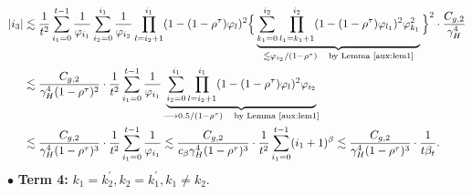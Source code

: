 \begin{align}\label{appen:A4:equ26}
|\uppercase\expandafter{\romannumeral1}_3|
&\lesssim \frac{1}{t^2} \sum_{i_1=0}^{t-1} \frac{1}{\varphi_{i_1}} \sum_{i_2=0}^{i_1} \frac{1}{\varphi_{i_2}} \prod_{l=i_2+1}^{i_1}(1- (1-\rho^\tau)\varphi_l)^2\Big\{\underbrace{\sum_{k_1=0}^{i_2} \prod_{l_1=k_1+1}^{i_2}(1- (1-\rho^\tau)\varphi_{l_1})^2 \varphi_{k_1}^2}_{\lesssim \varphi_{i_2}/(1-\rho^\tau)\quad\text{by Lemma \ref{aux:lem1}}}\Big\}^2\cdot\frac{C_{g,2}}{\gamma_H^4}\nonumber\\
&\lesssim \frac{C_{g,2}}{\gamma_H^4(1-\rho^\tau)^2}\cdot\frac{1}{t^2} \sum_{i_1=0}^{t-1}\frac{1}{\varphi_{i_1}}  \underbrace{\sum_{i_2=0}^{i_1} \prod_{l=i_2+1}^{i_1}(1-(1-\rho^\tau)\varphi_l)^2\varphi_{i_2}}_{\longrightarrow 0.5/(1-\rho^{\tau})\quad\text{by Lemma \ref{aux:lem1}}}\nonumber\\
&\lesssim \frac{C_{g,2}}{\gamma_H^4(1-\rho^\tau)^3}\cdot\frac{1}{t^2} \sum_{i_1=0}^{t-1}\frac{1}{\varphi_{i_1}}\lesssim \frac{C_{g,2}}{c_{\beta}\gamma_H^4(1-\rho^\tau)^3}\cdot\frac{1}{t^2} \sum_{i_1=0}^{t-1}(i_1+1)^\beta\lesssim \frac{C_{g,2}}{\gamma_H^4(1-\rho^\tau)^3}\cdot\frac{1}{t\beta_t}.
\end{align}
\noindent$\bullet$ \textbf{Term 4:} $k_1=k_2^{\prime}, k_2=k_1^{\prime},  k_1 \neq k_2$.

